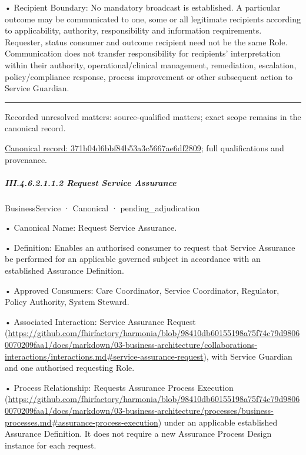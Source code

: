 •
Recipient Boundary: No mandatory broadcast is established. A particular outcome may be communicated to one, some or all legitimate recipients according to applicability, authority, responsibility and information requirements. Requester, status consumer and outcome recipient need not be the same Role. Communication does not transfer responsibility for recipients' interpretation within their authority, operational/clinical management, remediation, escalation, policy/compliance response, process improvement or other subsequent action to Service Guardian.



\medskip\hrule\medskip

{\small Recorded unresolved matters: source-qualified matters; exact scope remains in the canonical record.}\par
{\footnotesize \href{../../../../continuum/business/business-service/371b04d6bbf84b53a3c5667ae6df2809.md}{Canonical record: 371b04d6bbf84b53a3c5667ae6df2809}; full qualifications and provenance.}\par
\subparagraph*{III.4.6.2.1.1.2 Request Service Assurance}
\label{navigation:III.4.6.2.1.1.2}

\label{element:a76c0be369744fcfb5eb91b90c9b59e7}
{\small BusinessService · Canonical · pending\_adjudication}\par

•
Canonical Name: Request Service Assurance.



•
Definition: Enables an authorised consumer to request that Service Assurance be performed for an applicable governed subject in accordance with an established Assurance Definition.



•
Approved Consumers: Care Coordinator, Service Coordinator, Regulator, Policy Authority, System Steward.



•
Associated Interaction: Service Assurance Request (\url{https://github.com/fhirfactory/harmonia/blob/98410db60155198a75f74c79d98060070209faa1/docs/markdown/03-business-architecture/collaborations-interactions/interactions.md#service-assurance-request}), with Service Guardian and one authorised requesting Role.



•
Process Relationship: Requests Assurance Process Execution (\url{https://github.com/fhirfactory/harmonia/blob/98410db60155198a75f74c79d98060070209faa1/docs/markdown/03-business-architecture/processes/business-processes.md#assurance-process-execution}) under an applicable established Assurance Definition. It does not require a new Assurance Process Design instance for each request.



